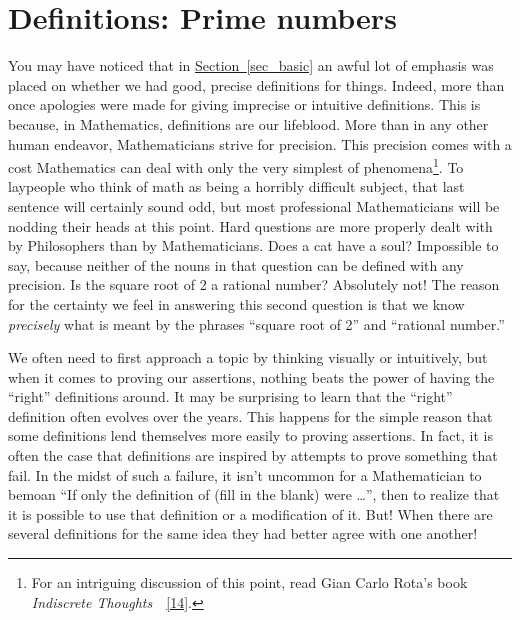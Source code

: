 \documentclass[10pt,]{book}
\theoremstyle{plain}
\theoremstyle{definition}
\theoremstyle{definition}
\numberwithin{equation}{section}
\begin{document}
\section[{Definitions: Prime numbers}]{Definitions: Prime numbers}\label{sec_def}

    You may have noticed that in \hyperref[sec_basic]{Section~\ref{sec_basic}} an awful lot of
    emphasis was placed on whether we had good, precise definitions
    for things. Indeed, more than once apologies were made for giving
    imprecise or intuitive definitions. This is because, in Mathematics,
    definitions are our lifeblood. More than in any other human
    endeavor, Mathematicians strive for precision. This precision
    comes with a cost \textemdash{} Mathematics can deal with only the very
    simplest of phenomena\footnote{For an intriguing discussion of this 
    point, read Gian Carlo Rota's book \emph{Indiscrete Thoughts}~~\hyperlink{rota}{[14]}.\label{fn-4}}.
    To laypeople who think of math as being
    a horribly difficult subject, that last sentence will certainly
    sound odd, but most professional Mathematicians will be nodding
    their heads at this point. Hard questions are more properly dealt
    with by Philosophers than by Mathematicians. Does a cat have
    a soul? Impossible
    to say, because neither of the nouns in that question can be
    defined with any precision. Is the square root of 2 a rational number?
    Absolutely not! The reason
    for the certainty we feel in answering this second question is
    that we know \emph{precisely} what is meant by the phrases
    ``square root of 2'' and ``rational number.''
\par

    We often need to first approach
    a topic by thinking visually or intuitively, but when it comes to
    proving our assertions, nothing beats the power of having the
    ``right'' definitions around. It may be surprising to learn that
    the ``right'' definition often evolves over the years. This
    happens for the simple reason that some definitions lend themselves
    more easily to proving assertions. In fact, it is often the case
    that definitions are inspired by attempts to prove something that
    fail. In the midst of such a failure, it isn't uncommon for a
    Mathematician to bemoan ``If only the definition of (fill in the
    blank) were \dots{}'', then to realize that it is possible to
    use that definition or a modification of it. But! When there are
    several definitions
    for the same idea they had better agree with one another!
\par
\end{document}
